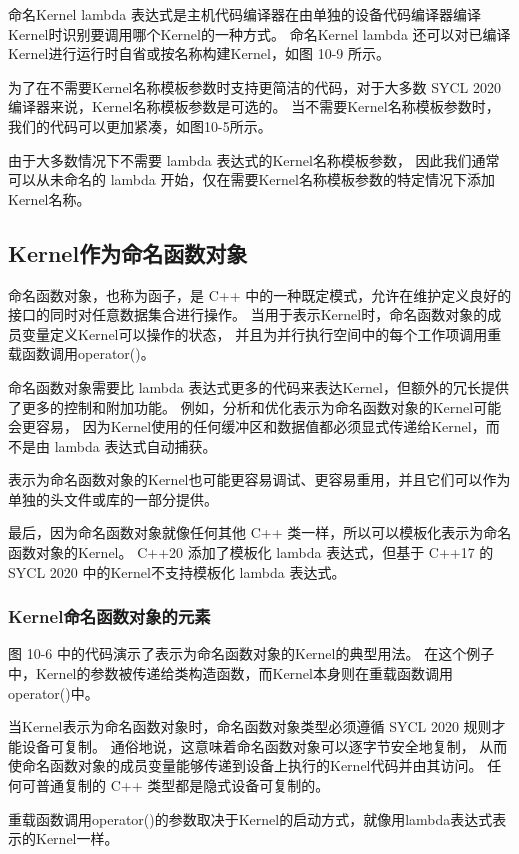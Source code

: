 命名Kernel lambda 表达式是主机代码编译器在由单独的设备代码编译器编译Kernel时识别要调用哪个Kernel的一种方式。 
命名Kernel lambda 还可以对已编译Kernel进行运行时自省或按名称构建Kernel，如图 10-9 所示。

为了在不需要Kernel名称模板参数时支持更简洁的代码，对于大多数 SYCL 2020 编译器来说，Kernel名称模板参数是可选的。 
当不需要Kernel名称模板参数时，我们的代码可以更加紧凑，如图10-5所示。

由于大多数情况下不需要 lambda 表达式的Kernel名称模板参数，
因此我们通常可以从未命名的 lambda 开始，仅在需要Kernel名称模板参数的特定情况下添加Kernel名称。

\subsection{Kernel作为命名函数对象}
命名函数对象，也称为函子，是 C++ 中的一种既定模式，允许在维护定义良好的接口的同时对任意数据集合进行操作。 
当用于表示Kernel时，命名函数对象的成员变量定义Kernel可以操作的状态，
并且为并行执行空间中的每个工作项调用重载函数调用operator()。

命名函数对象需要比 lambda 表达式更多的代码来表达Kernel，但额外的冗长提供了更多的控制和附加功能。 
例如，分析和优化表示为命名函数对象的Kernel可能会更容易，
因为Kernel使用的任何缓冲区和数据值都必须显式传递给Kernel，而不是由 lambda 表达式自动捕获。

表示为命名函数对象的Kernel也可能更容易调试、更容易重用，并且它们可以作为单独的头文件或库的一部分提供。

最后，因为命名函数对象就像任何其他 C++ 类一样，所以可以模板化表示为命名函数对象的Kernel。 
C++20 添加了模板化 lambda 表达式，但基于 C++17 的 SYCL 2020 中的Kernel不支持模板化 lambda 表达式。

\subsubsection{Kernel命名函数对象的元素}
图 10-6 中的代码演示了表示为命名函数对象的Kernel的典型用法。 
在这个例子中，Kernel的参数被传递给类构造函数，而Kernel本身则在重载函数调用operator()中。

当Kernel表示为命名函数对象时，命名函数对象类型必须遵循 SYCL 2020 规则才能设备可复制。 
通俗地说，这意味着命名函数对象可以逐字节安全地复制，
从而使命名函数对象的成员变量能够传递到设备上执行的Kernel代码并由其访问。 
任何可普通复制的 C++ 类型都是隐式设备可复制的。

重载函数调用operator()的参数取决于Kernel的启动方式，就像用lambda表达式表示的Kernel一样。

